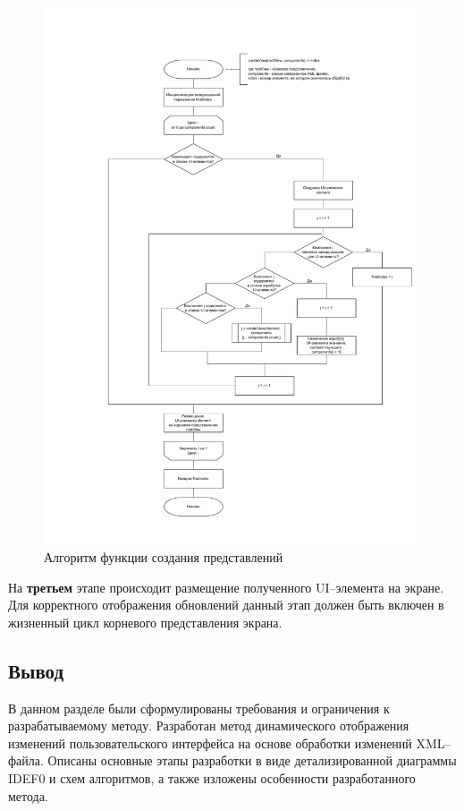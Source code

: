 \begin{figure}[!htb]
	\centering
	\includegraphics[scale=0.5]{img/createView.pdf}
	\caption{Алгоритм функции создания представлений}
	\label{fig:createView}
\end{figure}

\pagebreak
На \textbf{третьем} этапе происходит размещение полученного UI--элемента на экране. 
Для корректного отображения обновлений данный этап должен быть включен в жизненный цикл корневого представления экрана.


\subsection*{Вывод}

В данном разделе были сформулированы требования и ограничения к разрабатываемому методу. 
Разработан метод динамического отображения изменений пользовательского интерфейса на основе обработки изменений XML--файла.
Описаны основные этапы разработки в виде детализированной диаграммы IDEF0 и схем алгоритмов, а также изложены особенности разработанного метода. 

\pagebreak